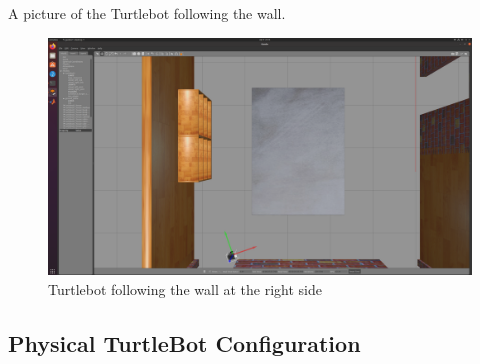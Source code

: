 \documentclass[12pt,a4paper]{article}
\begin{document}
	A picture of the Turtlebot following the wall.
	\begin{figure}[!h]
		\centering
		\includegraphics[width=\linewidth]{fig6.png}
		\caption{Turtlebot following the wall at the right side}
		\label{fig:fig6}
	\end{figure}
	\subsection{Physical TurtleBot Configuration}
	
\end{document}
